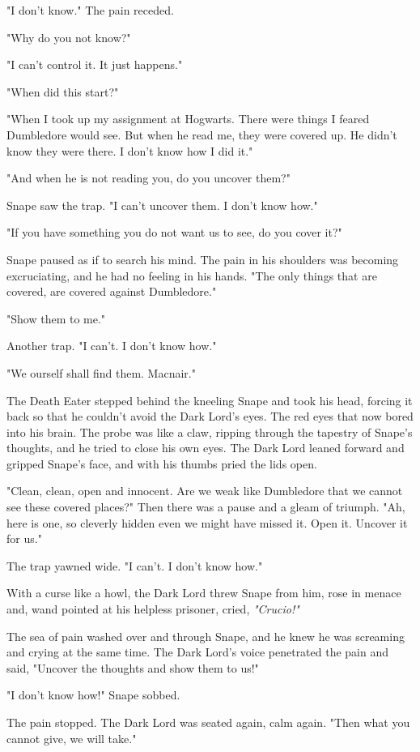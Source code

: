"I don't know." The pain receded.

"Why do you not know?"

"I can't control it. It just happens."

"When did this start?"

"When I took up my assignment at Hogwarts. There were things I feared Dumbledore would see. But when he read me, they were covered up. He didn't know they were there. I don't know how I did it."

"And when he is not reading you, do you uncover them?"

Snape saw the trap. "I can't uncover them. I don't know how."

"If you have something you do not want us to see, do you cover it?"

Snape paused as if to search his mind. The pain in his shoulders was becoming excruciating, and he had no feeling in his hands. "The only things that are covered, are covered against Dumbledore."

"Show them to me."

Another trap. "I can't. I don't know how."

"We ourself shall find them. Macnair."

The Death Eater stepped behind the kneeling Snape and took his head, forcing it back so that he couldn't avoid the Dark Lord's eyes. The red eyes that now bored into his brain. The probe was like a claw, ripping through the tapestry of Snape's thoughts, and he tried to close his own eyes. The Dark Lord leaned forward and gripped Snape's face, and with his thumbs pried the lids open.

"Clean, clean, open and innocent. Are we weak like Dumbledore that we cannot see these covered places?" Then there was a pause and a gleam of triumph. "Ah, here is one, so cleverly hidden even we might have missed it. Open it. Uncover it for us."

The trap yawned wide. "I can't. I don't know how."

With a curse like a howl, the Dark Lord threw Snape from him, rose in menace and, wand pointed at his helpless prisoner, cried, \emph{"Crucio!"}

The sea of pain washed over and through Snape, and he knew he was screaming and crying at the same time. The Dark Lord's voice penetrated the pain and said, "Uncover the thoughts and show them to us!"

"I don't know how!" Snape sobbed.

The pain stopped. The Dark Lord was seated again, calm again. "Then what you cannot give, we will take."

